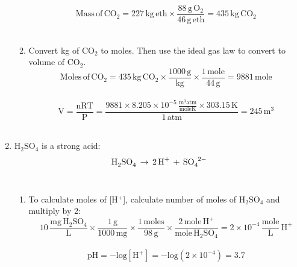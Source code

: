 \documentclass[12pt,letterpaper]{article}
\begin{document}
\begin{enumerate}
\begin{enumerate}
\begin{equation*}
\mathrm{Mass\, of\, CO_2 = 227\, kg\, eth\times \frac{88\, g\, O_2}{46\, g\, eth} = 435\, kg\, CO_2}
\end{equation*}\\

\item Convert kg of CO$_2$ to moles.  Then use the ideal gas law to convert to volume of CO$_2$.\\

\begin{equation*}
\mathrm{Moles\, of\, CO_2 = 435\, kg\, CO_2\times \frac{1000\, g}{kg} \times \frac{1\, mole}{44\, g} = 9881\, mole}
\end{equation*}\\

\begin{equation*}
\mathrm{V = \frac{nRT}{P} = \frac{9881\times 8.205\times 10^{-5}\, \frac{m^3atm}{moleK}\times 303.15\, K}{1\, atm} = 245 \, m^3}
\end{equation*}\\

\end{enumerate}

\item
$\mathrm{H_2SO_4}$ is a strong acid:\\

\begin{align*}
\cee{H_2SO_4\, \rightarrow \, 2H^+ \, + \,  SO_4^{2-}}
\end{align*}\\



\begin{enumerate}
\item To calculate moles of [H$^+$], calculate number of moles of $\mathrm{H_2SO_4}$ and multiply by 2:\\


\begin{equation*}
\mathrm{10\, \frac{mg\, H_2SO_4}{L}\times \frac{1\, g}{1000\, mg}\times \frac{1\,moles}{98\, g}\times \frac{2 \, mole \, H^+}{mole\, H_2SO_4} = 2\times 10^{-4}\,\frac{mole}{L}\, H^+}
\end{equation*}\\


\begin{equation*}
\mathrm{pH = -log[H^+] = -log(2\times 10^{-4}) = 3.7}
\end{equation*}\\



\end{enumerate}
\end{enumerate}
\end{document}

